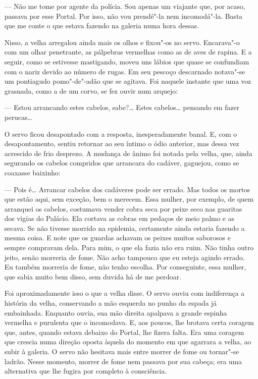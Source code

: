 --- Não me tome por agente da polícia. Sou apenas um viajante que, por
acaso, passava por esse Portal. Por isso, não vou prendê"-la nem
incomodá"-la. Basta que me conte o que estava fazendo na galeria numa
hora dessas.

Nisso, a velha arregalou ainda mais os olhos e fixou"-os no servo.
Encarava"-o com um olhar penetrante, as pálpebras vermelhas como as de
aves de rapina. E a seguir, como se estivesse mastigando, moveu uns
lábios que quase se confundiam com o nariz devido ao número de rugas.
Em seu pescoço descarnado notava"-se um pontiagudo pomo"-de"-adão que se
agitava. Foi naquele instante que uma voz grasnada, como a de um corvo,
se fez ouvir num arquejo:

--- Estou arrancando estes cabelos, sabe?\ldots{} Estes cabelos\ldots{} pensando em
fazer perucas\ldots{}

O servo ficou desapontado com a resposta, inesperadamente banal. E, com
o desapontamento, sentiu retornar ao seu íntimo o ódio anterior, mas
dessa vez acrescido de frio desprezo. A mudança de ânimo foi notada
pela velha, que, ainda segurando os cabelos compridos que arrancara do
cadáver, gaguejou, como se coaxasse baixinho:

--- Pois é\ldots{} Arrancar cabelos dos cadáveres pode ser errado. Mas todos os
mortos que estão aqui, sem exceção, bem o merecem. Essa mulher, por
exemplo, de quem arranquei os cabelos, costumava vender cobra seca por
peixe seco nas guaritas dos vigias do Palácio. Ela cortava as cobras em
pedaços de meio palmo e as secava. Se não tivesse morrido na epidemia,
certamente ainda estaria fazendo a mesma coisa. E note que os guardas
achavam os peixes muitos saborosos e sempre compravam dela. Para mim, o
que ela fazia não era ruim. Não tinha outro jeito, senão morreria de
fome. Não acho tampouco que eu esteja agindo errado. Eu também morreria
de fome, não tenho escolha. Por conseguinte, essa mulher, que sabia
muito bem disso, sem duvida há de me perdoar.

Foi aproximadamente isso o que a velha disse. O servo ouviu com
indiferença a história da velha, conservando a mão esquerda no punho da
espada já embainhada. Enquanto ouvia, sua mão direita apalpava a grande
espinha vermelha e purulenta que o incomodava. E, aos poucos, lhe
brotava certa coragem que, antes, quando estava debaixo do Portal, lhe
fizera falta. Era uma coragem que crescia numa direção oposta àquela do
momento em que agarrara a velha, ao subir à galeria. O servo não
hesitava mais entre morrer de fome ou tornar"-se ladrão. Nesse momento,
morrer de fome nem passava por sua cabeça; era uma alternativa que lhe
fugira por completo à consciência.

